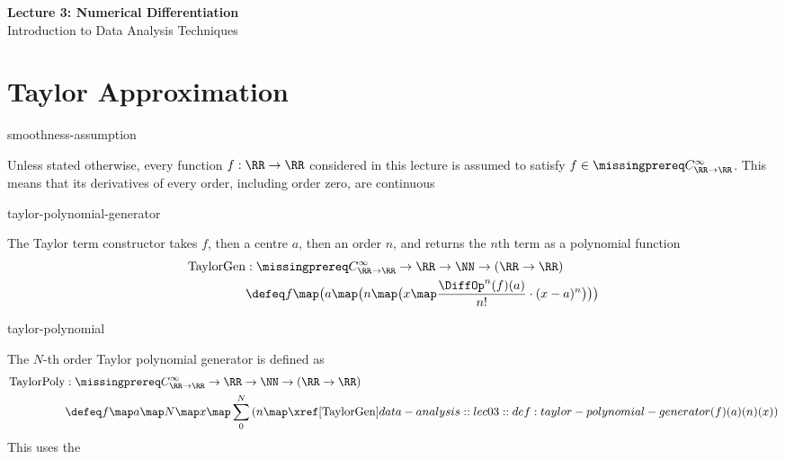 \documentclass[12pt]{article}
\numberwithin{figure}{section}
\begin{document}
\begin{center}
  {\LARGE\bfseries Lecture 3: Numerical Differentiation}\\[0.15em]
  {\large Introduction to Data Analysis Techniques}\\[0.15em]
\end{center}

\section{Taylor Approximation}

\begin{conv}{smoothness-assumption}

  Unless stated otherwise, every function $f:\RR\to\RR$ considered in
  this lecture is assumed to satisfy $f\in\SmoothRealFunctions$.
  This means that its derivatives of every order, including order zero,
  are continuous
\end{conv}

\begin{dfn}{taylor-polynomial-generator}
  \leavevmode\par
  \begingroup\color{notesmissingprereq}
  \par\smallskip
  The Taylor term constructor takes $f$, then a centre $a$, then an order
  $n$, and returns the $n$th term as a polynomial function
  \[
    \begin{aligned}
      \mathrm{TaylorGen} &: \SmoothRealFunctions\to\RR\to\NN
        \to(\RR\to\RR)\\
      &\defeq f\map\bigl(a\map\bigl(n\map\bigl(x\map
        \frac{\DiffOp^n(f)(a)}{n!}\cdot(x-a)^n\bigr)\bigr)\bigr)
    \end{aligned}
  \]
  \par\endgroup
\end{dfn}

\begin{dfn}{taylor-polynomial}
  \leavevmode\par
  \begingroup\color{notesmissingprereq}
  \par\smallskip
The $N$-th order Taylor polynomial generator is defined as
\[
  \begin{aligned}
    \mathrm{TaylorPoly} &: \SmoothRealFunctions\to\RR\to\NN\to(\RR\to\RR) \\
    &\defeq f\map a\map N\map x\map
      \sum_0^N\left(n\map\TaylorGen(f)(a)(n)(x)\right)
  \end{aligned}
\]
  This uses the 
  \par\endgroup
\end{dfn}
\end{document}
